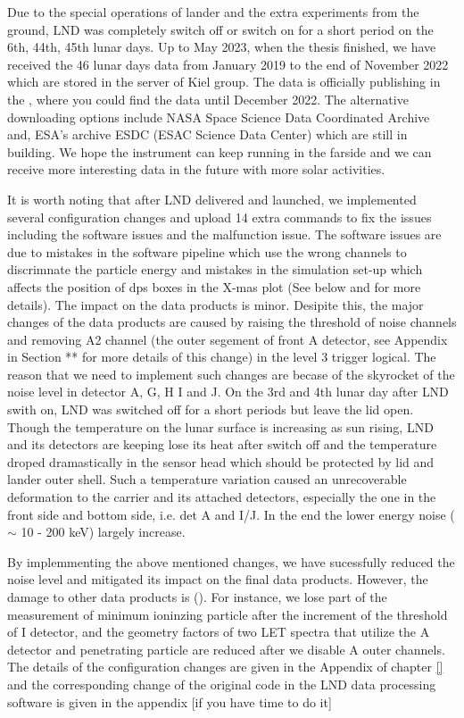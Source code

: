 Due to the special operations of lander and the extra experiments from the ground, LND was completely switch off or switch on for a short period on the 6th, 44th, 45th lunar days. Up to May 2023, when the thesis finished, we have received the 46 lunar days data from January 2019 to the end of November 2022 which are stored in the server of Kiel group. The data is officially publishing in the , where you could find the data until December 2022. 
The alternative downloading options include NASA Space Science Data Coordinated Archive and, ESA's archive ESDC (ESAC Science Data Center) which are still in building. We hope the instrument can keep running in the farside and we can receive more interesting data in the future with more solar activities.


It is worth noting that after LND delivered and launched, we implemented several configuration changes and upload 14 extra commands to fix the issues including the software issues and the malfunction issue. The software issues are due to mistakes in the software pipeline which use the wrong channels to discrimnate the particle energy and mistakes in the simulation set-up which affects the position of \ac{dps} boxes in the X-mas plot (See below and \cite{Wimmer-2020-LND} for more details). The impact on the data products is minor. 
Desipite this, the major changes of the data products are caused by raising the threshold of noise channels and removing A2 channel (the outer segement of front A detector, see Appendix in Section ** for more details of this change) in the level 3 trigger logical. The reason that we need to implement such changes are becase of the skyrocket of the noise level in detector A, G, H I and J. On the 3rd and 4th lunar day after \ac{LND} swith on, \ac{LND} was switched off for a short periods but leave the lid open. Though the temperature on the lunar surface is increasing as sun rising, LND and its detectors are keeping lose its heat after switch off and the temperature droped dramastically in the sensor head which should be protected by lid and lander outer shell. Such a temperature variation caused an unrecoverable deformation to the carrier and its attached detectors, especially the one in the front side and bottom side, i.e. det A and I/J. In the end the lower energy noise ($\sim$ 10 - 200 keV) largely increase.

By implemmenting the above mentioned changes, we have sucessfully reduced the noise level and mitigated its impact on the final data products. However, the damage to other data products is (). For instance, we lose part of the measurement of minimum ioninzing particle after the increment of the threshold of I detector, and the geometry factors of two LET spectra that utilize the A detector and penetrating particle are reduced after we disable A outer channels. The details of the configuration changes are given in the Appendix of chapter \ref{} and the corresponding change of the original code in the LND data processing software is given in the appendix [if you have time to do it]




